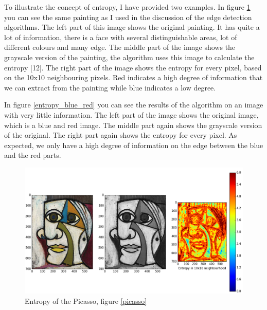 \documentclass[12pt]{article}
\begin{document}
To illustrate the concept of entropy, I have provided two examples. In figure \ref{entropy_picasso} you can see the same painting as I used in the discussion of the edge detection algorithms. The left part of this image shows the original painting. It has quite a lot of information, there is a face with several distinguishable areas, lot of different colours and many edge. The middle part of the image shows the grayscale version of the painting, the algorithm uses this image to calculate the entropy [12]. The right part of the image shows the entropy for every pixel, based on the 10x10 neighbouring pixels. Red indicates a high degree of information that we can extract from the painting while blue indicates a low degree.
\newline

In figure \ref{entropy_blue_red} you can see the results of the algorithm on an image with very little information. The left part of the image shows the original image, which is a blue and red image. The middle part again shows the grayscale version of the original. The right part again shows the entropy for every pixel. As expected, we only have a high degree of information on the edge between the blue and the red parts.
  
\begin{figure}[H]
\hspace*{-0.8cm}
\centering
\includegraphics[scale = 0.35]{img/entropy_picasso}
\caption{Entropy of the Picasso, figure \ref{picasso}}
\label{entropy_picasso}
\end{figure} 
\end{document}
